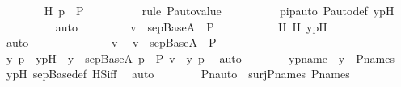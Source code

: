 \begin{isabellebody}
\ \ \ \ \ \ \isamarkupfalse%
\ H{}{\isacharcolon}{\kern0pt}\ {\isachardoublequoteopen}{\isasympi}{\isacharbackquote}{\kern0pt}p\ {\isasymin}\ P{\isachardoublequoteclose}\ \isanewline
\ \ \ \ \ \ \ \ \isamarkupfalse%
{\isacharparenleft}{\kern0pt}rule\ P{\isacharunderscore}{\kern0pt}auto{\isacharunderscore}{\kern0pt}value{\isacharparenright}{\kern0pt}\isanewline
\ \ \ \ \ \ \ \ \isamarkupfalse%
\ pipauto\ P{\isacharunderscore}{\kern0pt}auto{\isacharunderscore}{\kern0pt}def\ ypH\isanewline
\ \ \ \ \ \ \ \ \isamarkupfalse%
\ auto\ \isanewline
\ \ \ \ \ \ \isamarkupfalse%
\ {\isachardoublequoteopen}v\ {\isasymin}\ sep{\isacharunderscore}{\kern0pt}Base{\isacharparenleft}{\kern0pt}A{\isacharparenright}{\kern0pt}\ {\isasymtimes}\ P{\isachardoublequoteclose}\ \isanewline
\ \ \ \ \ \ \ \ \isamarkupfalse%
\ H{}\ H{}\ ypH\ \isanewline
\ \ \ \ \ \ \ \ \isamarkupfalse%
\ auto\isanewline
\ \ \ \ \isamarkupfalse%
\ \isanewline
\ \ \ \ \ \ \isamarkupfalse%
\ v\ \isamarkupfalse%
\ {\isachardoublequoteopen}v\ {\isasymin}\ sep{\isacharunderscore}{\kern0pt}Base{\isacharparenleft}{\kern0pt}A{\isacharparenright}{\kern0pt}\ {\isasymtimes}\ P{\isachardoublequoteclose}\ \isanewline
\ \ \ \ \ \ \isamarkupfalse%
\ \isamarkupfalse%
\ y\ p\ \ ypH\ {\isacharcolon}{\kern0pt}\ {\isachardoublequoteopen}y\ {\isasymin}\ sep{\isacharunderscore}{\kern0pt}Base{\isacharparenleft}{\kern0pt}A{\isacharparenright}{\kern0pt}{\isachardoublequoteclose}\ {\isachardoublequoteopen}p\ {\isasymin}\ P{\isachardoublequoteclose}\ {\isachardoublequoteopen}v\ {\isacharequal}{\kern0pt}\ {\isasymlangle}y{\isacharcomma}{\kern0pt}\ p{\isasymrangle}{\isachardoublequoteclose}\ \isamarkupfalse%
\ auto\isanewline
\isanewline
\ \ \ \ \ \ \isamarkupfalse%
\ ypname\ {\isacharcolon}{\kern0pt}\ {\isachardoublequoteopen}y\ {\isasymin}\ P{\isacharunderscore}{\kern0pt}names{\isachardoublequoteclose}\ \isamarkupfalse%
\ ypH\ sep{\isacharunderscore}{\kern0pt}Base{\isacharunderscore}{\kern0pt}def\ HS{\isacharunderscore}{\kern0pt}iff\ \isamarkupfalse%
\ auto\isanewline
\isanewline
\ \ \ \ \ \ \isamarkupfalse%
\ {\isachardoublequoteopen}Pn{\isacharunderscore}{\kern0pt}auto{\isacharparenleft}{\kern0pt}{\isasympi}{\isacharparenright}{\kern0pt}\ {\isasymin}\ surj{\isacharparenleft}{\kern0pt}P{\isacharunderscore}{\kern0pt}names{\isacharcomma}{\kern0pt}\ P{\isacharunderscore}{\kern0pt}names{\isacharparenright}{\kern0pt}{\isachardoublequoteclose}\ \isanewline

\end{isabellebody}

